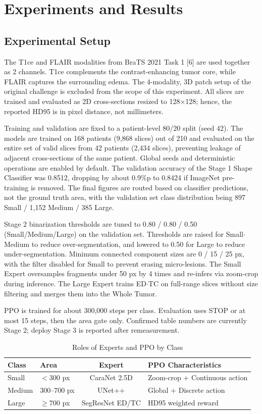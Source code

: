\documentclass[11pt,a4paper]{article}
\begin{document}
\section{Experiments and Results}
\subsection{Experimental Setup}
The T1ce and FLAIR modalities from BraTS 2021 Task 1 [6] are used together as 2 channels. T1ce complements the contrast-enhancing tumor core, while FLAIR captures the surrounding edema. The 4-modality, 3D patch setup of the original challenge is excluded from the scope of this experiment. All slices are trained and evaluated as 2D cross-sections resized to 128$\times$128; hence, the reported HD95 is in pixel distance, not millimeters.

Training and validation are fixed to a patient-level 80/20 split (seed 42). The models are trained on 168 patients (9,868 slices) out of 210 and evaluated on the entire set of valid slices from 42 patients (2,434 slices), preventing leakage of adjacent cross-sections of the same patient. Global seeds and deterministic operations are enabled by default. The validation accuracy of the Stage 1 Shape Classifier was 0.8512, dropping by about 0.9\%p to 0.8424 if ImageNet pre-training is removed. The final figures are routed based on classifier predictions, not the ground truth area, with the validation set class distribution being 897 Small / 1,152 Medium / 385 Large.

Stage 2 binarization thresholds are tuned to 0.80 / 0.80 / 0.50 (Small/Medium/Large) on the validation set. Thresholds are raised for Small$\cdot$Medium to reduce over-segmentation, and lowered to 0.50 for Large to reduce under-segmentation. Minimum connected component sizes are 0 / 15 / 25 px, with the filter disabled for Small to prevent erasing micro-lesions. The Small Expert oversamples fragments under 50 px by 4 times and re-infers via zoom-crop during inference. The Large Expert trains ED$\cdot$TC on full-range slices without size filtering and merges them into the Whole Tumor.

PPO is trained for about 300,000 steps per class. Evaluation uses STOP or at most 15 steps, then the area gate only. Confirmed table numbers are currently Stage 2; deploy Stage 3 is reported after remeasurement.

\begin{table}[htbp]
    \centering
    \caption{Roles of Experts and PPO by Class}
    \begin{tabular}{llcl}
        \toprule
        Class & Area & Expert & PPO Characteristics \\
        \midrule
        Small & $< 300$ px & CaraNet 2.5D & Zoom-crop + Continuous action \\
        Medium & 300--700 px & UNet++ & Global + Discrete action \\
        Large & $\ge 700$ px & SegResNet ED/TC & HD95 weighted reward \\
        \bottomrule
    \end{tabular}
    \label{tab:roles}
\end{table}
\end{document}
